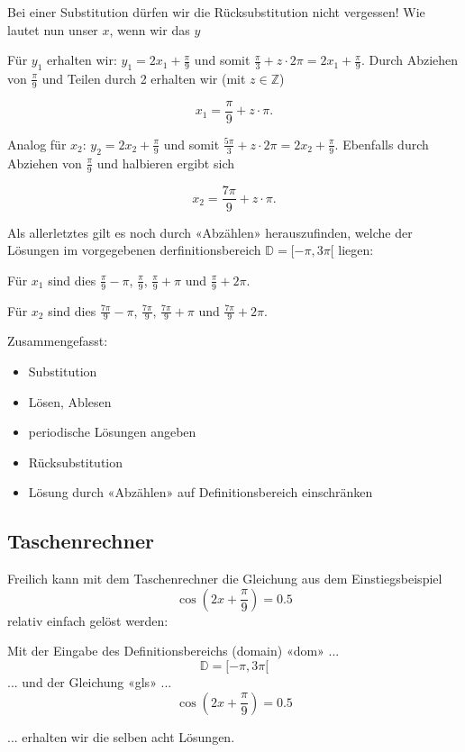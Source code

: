 Bei einer Substitution dürfen wir die Rücksubstitution nicht vergessen! Wie lautet nun unser $x$, wenn wir das $y$ 

Für $y_1$ erhalten wir: $y_1= 2x_1 + \frac{\pi}{9}$ und somit $\frac{\pi}{3} + z\cdot{}2\pi = 2x_1 + \frac{\pi}{9}$. Durch Abziehen von $\frac{\pi}{9}$ und Teilen durch 2 erhalten wir (mit $z\in\mathbb{Z}$)

$$x_1 = \frac{\pi}{9} + z\cdot{}\pi.$$

Analog für $x_2$: $y_2 = 2x_2 + \frac{\pi}{9}$ und somit $\frac{5\pi}{3} + z\cdot{}2\pi = 2x_2 + \frac{\pi}{9}$. Ebenfalls durch Abziehen von $\frac{\pi}{9}$ und halbieren ergibt sich

$$x_2 = \frac{7\pi}{9} + z\cdot{}\pi.$$

Als allerletztes gilt es noch durch «Abzählen» herauszufinden, welche der Lösungen im vorgegebenen derfinitionsbereich $\mathbb{D} = [-\pi, 3\pi[$ liegen:

    Für $x_1$ sind dies $\frac{\pi}{9} - \pi$, $\frac{\pi}{9}$, $\frac{\pi}{9} + \pi$ und $\frac{\pi}{9} + 2\pi$.

    Für $x_2$ sind dies $\frac{7\pi}{9} - \pi$, $\frac{7\pi}{9}$, $\frac{7\pi}{9} + \pi$ und $\frac{7\pi}{9} + 2\pi$.
   
Zusammengefasst:
\begin{itemize}
    \item Substitution
    \item Lösen, Ablesen
    \item periodische Lösungen angeben
    \item Rücksubstitution
    \item Lösung durch «Abzählen» auf Definitionsbereich einschränken
\end{itemize}
\newpage

\subsection{Taschenrechner}
Freilich kann mit dem Taschenrechner die Gleichung aus dem
Einstiegsbeispiel $$\cos(2x+\frac{\pi}{9})=0.5$$ relativ einfach gelöst werden:

Mit der Eingabe des Definitionsbereichs (domain) «dom» ...
$$\mathbb{D} =  [ -\pi, 3\pi[$$
... und der Gleichung «gls» ...
$$\cos\left(2x+\frac{\pi}{9}\right) = 0.5$$

... erhalten wir die selben acht Lösungen.
    
\newpage

